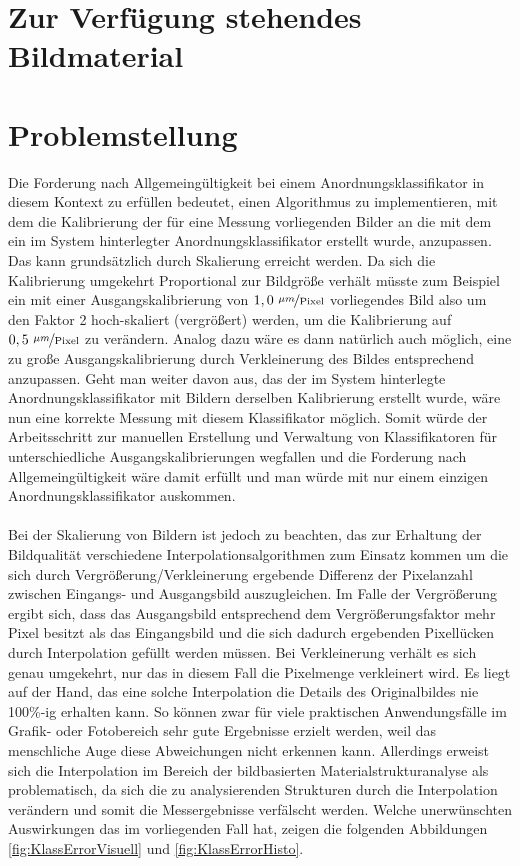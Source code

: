 \documentclass[
fontsize=10pt, 
listof = totoc,
parskip = half	
]{report}
\begin{document}
\section{Zur Verfügung stehendes Bildmaterial}
\label{subsec:Bildmaterial}

\section{Problemstellung}
\label{sec:Problemstellung}

Die Forderung nach Allgemeingültigkeit bei einem Anordnungsklassifikator in diesem Kontext zu erfüllen bedeutet, einen Algorithmus zu implementieren, mit dem die Kalibrierung der für eine Messung vorliegenden Bilder an die mit dem ein im System hinterlegter Anordnungsklassifikator erstellt wurde, anzupassen. Das kann grundsätzlich durch Skalierung erreicht werden. Da sich die Kalibrierung umgekehrt Proportional zur Bildgröße verhält müsste zum Beispiel ein mit einer Ausgangskalibrierung von $1,0~\nicefrac{\mu m}{\text{Pixel}}$ vorliegendes Bild also um den Faktor 2 hoch-skaliert (vergrößert) werden, um die Kalibrierung auf $0,5~\nicefrac{\mu m}{\text{Pixel}}$ zu verändern. Analog dazu wäre es dann natürlich auch möglich, eine zu große Ausgangskalibrierung durch Verkleinerung des Bildes entsprechend anzupassen. Geht man weiter davon aus, das der im System hinterlegte Anordnungsklassifikator mit Bildern derselben Kalibrierung erstellt wurde, wäre nun eine korrekte Messung mit diesem Klassifikator möglich. Somit würde der Arbeitsschritt zur manuellen Erstellung und Verwaltung von Klassifikatoren für unterschiedliche Ausgangskalibrierungen wegfallen und die Forderung nach Allgemeingültigkeit wäre damit erfüllt und man würde mit nur einem einzigen Anordnungsklassifikator auskommen.
\\\\
Bei der Skalierung von Bildern ist jedoch zu beachten, das zur Erhaltung der Bildqualität verschiedene Interpolationsalgorithmen zum Einsatz kommen um die sich durch Vergrößerung/Verkleinerung ergebende Differenz der Pixelanzahl zwischen Eingangs- und Ausgangsbild auszugleichen. Im Falle der Vergrößerung ergibt sich, dass das Ausgangsbild entsprechend dem Vergrößerungsfaktor mehr Pixel besitzt als das Eingangsbild und die sich dadurch ergebenden Pixellücken durch Interpolation gefüllt werden müssen. Bei Verkleinerung verhält es sich genau umgekehrt, nur das in diesem Fall die Pixelmenge verkleinert wird. Es liegt auf der Hand, das eine solche Interpolation die Details des Originalbildes nie 100\%-ig erhalten kann. So können zwar für viele praktischen Anwendungsfälle im Grafik- oder Fotobereich sehr gute Ergebnisse erzielt werden, weil das menschliche Auge diese Abweichungen nicht erkennen kann. Allerdings erweist sich die Interpolation im Bereich der bildbasierten Materialstrukturanalyse als problematisch, da sich  die zu analysierenden Strukturen durch die Interpolation verändern und somit die Messergebnisse verfälscht werden. Welche unerwünschten Auswirkungen das im vorliegenden Fall hat, zeigen die folgenden Abbildungen \ref{fig:KlassErrorVisuell} und \ref{fig:KlassErrorHisto}.
\end{document}
